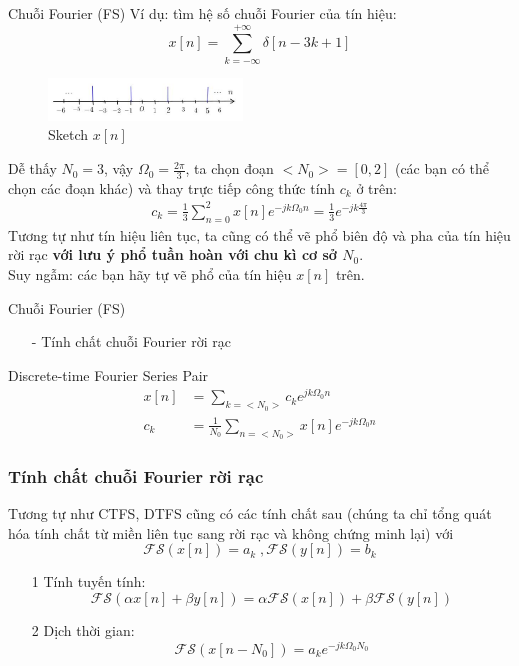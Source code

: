 \documentclass[8pt]{beamer}
\begin{document}
\begin{frame}{Chuỗi Fourier (FS)}
Ví dụ: tìm hệ số chuỗi Fourier của tín hiệu: $$x[n]=\sum_{k=-\infty}^{+\infty}\delta[n-3k+1]$$
\begin{figure}[h]
			\includegraphics[width=0.46\textwidth]{d.jpg}
			\caption{Sketch $x[n]$}\label{fig:re11}

		\end{figure}
Dễ thấy $N_{0}=3$, vậy $\Omega_{0}=\frac{2\pi}{3}$, ta chọn đoạn $<N_{0}>=[0,2]$ (các bạn có thể chọn các đoạn khác) và thay trực tiếp công thức tính $c_{k}$ ở trên:
\begin{equation*}
\begin{split}
	c_{k}=\frac{1}{3}\sum_{n=0}^2 x[n]e^{-jk\Omega_{0}n}=\frac{1}{3}e^{-jk\frac{4\pi}{3}}
\end{split}
\end{equation*}
Tương tự như tín hiệu liên tục, ta cũng có thể vẽ phổ biên độ và pha của tín hiệu rời rạc \textbf{với lưu ý phổ tuần hoàn với chu kì cơ sở $N_{0}$}.
\\ Suy ngẫm: các bạn hãy tự vẽ phổ của tín hiệu $x[n]$ trên.
\end{frame}
\begin{frame}{Chuỗi Fourier (FS)}
\begin{itemize}
	\item[-] Tính chất chuỗi Fourier rời rạc
\end{itemize}
\begin{block}{Discrete-time Fourier Series Pair}
	\begin{equation*}
		\begin{split}
			x[n]&=\sum_{k=<N_{0}>}c_{k}e^{jk\Omega_{0}n}\\
			c_{k}&=\frac{1}{N_{0}}\sum_{n=<N_{0}>}x[n]e^{-jk\Omega_{0}n}
\end{split}
\end{equation*}
\end{block}
\subsubsection{Tính chất chuỗi Fourier rời rạc}
Tương tự như CTFS, DTFS cũng có các tính chất sau (chúng ta chỉ tổng quát hóa tính chất từ miền liên tục sang rời rạc và không chứng minh lại)
với $$\mathscr{FS}(x[n])=a_{k}\; , \mathscr{FS}(y[n])=b_{k}$$
\begin{enumerate}
	\item[1] Tính tuyến tính: $$\mathscr{FS}(\alpha x[n]+\beta y[n])=\alpha\mathscr{FS}(x[n])+\beta\mathscr{FS}(y[n])$$
	\item[2] Dịch thời gian: $$\mathscr{FS}(x[n-N_{0}])=a_{k}e^{-jk\Omega_{0}N_{0}}$$
\end{enumerate}
\end{frame}
\end{document}
